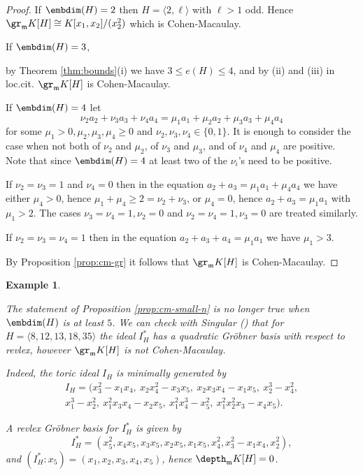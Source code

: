 \documentclass[12pt]{amsart}
\def\frk{\mathfrak}               %
\def\mm{{\frk m}}
\newtheorem{Example}[Theorem]{Example}
\begin{document}
\begin{proof}
If  {$\embdim(H)=2$} then $H=\langle 2, \ell \rangle$ with $\ell >1$ odd. Hence $\gr_\mm K[H] \cong K[x_1,x_2]/(x_2^2)$ which is Cohen-Macaulay.

If  {$\embdim(H)=3$},  

by Theorem \ref{thm:bounds}(i) we have $3\leq e(H) \leq 4$, and by (ii) and (iii) in loc.cit.  $\gr_\mm K[H]$ is Cohen-Macaulay.

If  {$\embdim(H)=4$} let 
$$
\nu_2 a_2 +\nu_3 a_3+ \nu_4 a_4=\mu_1 a_1+ \mu_2 a_2 +\mu_3 a_3+ \mu_4 a_4
$$  
for some $\mu_1 >0, \mu_2, \mu_3 , \mu_4 \geq 0$ and $\nu_2, \nu_3, \nu_4 \in\{0,1\}$.
It is enough to consider the case when not both of $\nu_2$ and $\mu_2$,  of $\nu_3$ and $\mu_3$, and of $\nu_4$ and $\mu_4$ are positive.
Note that since $\embdim(H)=4$ at least two of the $\nu_i$'s need to be positive.

If $\nu_2=\nu_3=1$ and $\nu_4=0$ then in the equation $a_2+a_3=\mu_1 a_1+\mu_4 a_4$ we have either $\mu_4>0$, 
hence $\mu_1+\mu_4 \geq 2=\nu_2+\nu_3$, or $\mu_4=0$, hence $a_2+a_3=\mu_1 a_1$ with $\mu_1 >2$.
The cases $\nu_3=\nu_4=1, \nu_2=0$ and $\nu_2=\nu_4=1, \nu_3=0$ are treated similarly.

If $\nu_2=\nu_3=\nu_4=1$ then in the equation $a_2+a_3+a_4=\mu_1 a_1$ we have  $\mu_1>3$. 

By Proposition \ref{prop:cm-gr} it follows that $\gr_\mm K[H]$ is Cohen-Macaulay.
\end{proof}

\begin{Example}
\label{ex:quad-non-cm}
{\em
The statement of Proposition \ref{prop:cm-small-n} is no longer true when $\embdim(H)$ is at least $5$. We can check with Singular (\cite{Sing}) that for 
$H= \langle 8,12,13,18,35 \rangle$ the ideal $I_H^*$ has a quadratic Gr\"obner basis with respect to revlex, however $\gr_\mm K[H]$ is not Cohen-Macaulay.
 
Indeed, the toric ideal $I_H$ is minimally generated by
\begin{multline*}
I_H= (x_3^2-x_1 x_4, \ x_2 x_4^2-x_3 x_5,\ x_2 x_3 x_4-x_1 x_5, \ x_2^3-x_4^2,  \\ 
	x_1^3-x_2^2, \ x_1^2 x_3 x_4-x_2 x_5,\  x_1^2 x_4^3-x_5^2, \ x_1^2 x_2^2 x_3-x_4 x_5).
\end{multline*}

A revlex Gr\"obner basis for $I_H^*$ is given by
$$
I_H^*=(x_5^2, x_4 x_5, x_3 x_5, x_2 x_5, x_1x_5, x_4^2, x_3^2-x_1x_4,x_2^2),
$$
and $(I_H^*:x_5)= (x_1, x_2, x_3, x_4, x_5)$, hence $\depth_\mm K[H]=0$.
}
\end{Example}
\end{document}
